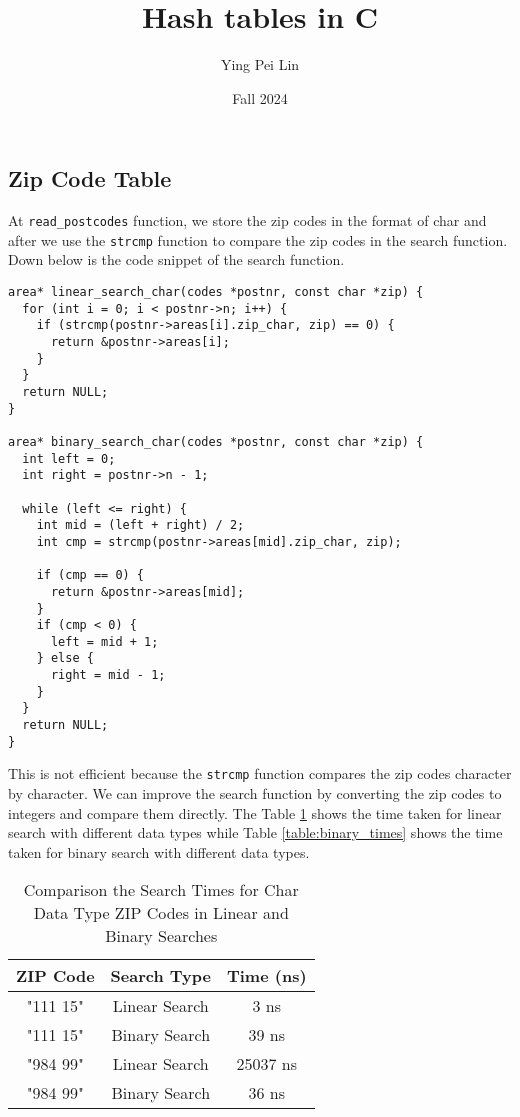 \documentclass[a4paper,11pt]{article}
\begin{document}
\title{
  \textbf{Hash tables in C}
}
\author{Ying Pei Lin}
\date{Fall 2024}

\maketitle

\subsection*{Zip Code Table}

At {\tt read\_postcodes} function, we store the zip codes in the format of char and after
we use the {\tt strcmp} function to compare the zip codes in the search function. Down below
is the code snippet of the search function.

\begin{verbatim}
area* linear_search_char(codes *postnr, const char *zip) {
  for (int i = 0; i < postnr->n; i++) {
    if (strcmp(postnr->areas[i].zip_char, zip) == 0) {
      return &postnr->areas[i];
    }
  }
  return NULL;
}

area* binary_search_char(codes *postnr, const char *zip) {
  int left = 0;
  int right = postnr->n - 1;
  
  while (left <= right) {
    int mid = (left + right) / 2;
    int cmp = strcmp(postnr->areas[mid].zip_char, zip);
    
    if (cmp == 0) {
      return &postnr->areas[mid];
    }
    if (cmp < 0) {
      left = mid + 1;
    } else {
      right = mid - 1;
    }
  }
  return NULL;
}
\end{verbatim}

This is not efficient because the {\tt strcmp} function compares the zip codes character by character.
We can improve the search function by converting the zip codes to integers and compare them directly.
The Table \ref{table:linear_times} shows the time taken for linear search with different data types
while Table \ref{table:binary_times} shows the time taken for binary search with different data types.

\begin{table}[h!]
  \centering
  \begin{tabular}{|c|c|c|}
    \hline
    \textbf{ZIP Code} & \textbf{Search Type} & \textbf{Time (ns)} \\ \hline
    "111 15" & Linear Search & 3 ns \\ \hline
    "111 15" & Binary Search & 39 ns \\ \hline
    "984 99" & Linear Search & 25037 ns \\ \hline
    "984 99" & Binary Search & 36 ns \\ \hline
  \end{tabular}
  \caption{Comparison the Search Times for Char Data Type ZIP Codes in Linear and Binary Searches}
  \label{table:linear_times}
\end{table}
\end{document}
